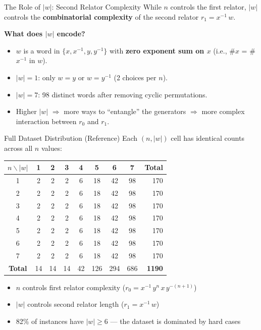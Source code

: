 \documentclass[aspectratio=169,11pt]{beamer}
\newcommand{\inv}[1]{#1^{-1}}
\begin{document}
\begin{frame}{The Role of $|w|$: Second Relator Complexity}
  \small
  While $n$ controls the first relator, $|w|$ controls the \textbf{combinatorial complexity}
  of the second relator $r_1 = \inv{x}\, w$.

  \medskip
  \textbf{What does $|w|$ encode?}
  \begin{itemize}\setlength\itemsep{2pt}
    \item $w$ is a word in $\{x, \inv{x}, y, \inv{y}\}$ with \textbf{zero exponent sum on $x$}
      (i.e., \#$x$ = \#$\inv{x}$ in $w$).
    \item $|w| = 1$: only $w = y$ or $w = \inv{y}$ (2 choices per $n$).
    \item $|w| = 7$: 98 distinct words after removing cyclic permutations.
    \item Higher $|w|$ $\Rightarrow$ more ways to ``entangle'' the generators
      $\Rightarrow$ more complex interaction between $r_0$ and $r_1$.
  \end{itemize}

\end{frame}

\begin{frame}{Full Dataset Distribution (Reference)}
  Each $(n, |w|)$ cell has identical counts across all $n$ values:

  \medskip
  \begin{center}
  \small
  \begin{tabular}{c|ccccccc|r}
    \toprule
    $n \backslash |w|$ & 1 & 2 & 3 & 4 & 5 & 6 & 7 & \textbf{Total} \\
    \midrule
    1 & 2 & 2 & 2 & 6 & 18 & 42 & 98 & 170 \\
    2 & 2 & 2 & 2 & 6 & 18 & 42 & 98 & 170 \\
    3 & 2 & 2 & 2 & 6 & 18 & 42 & 98 & 170 \\
    4 & 2 & 2 & 2 & 6 & 18 & 42 & 98 & 170 \\
    5 & 2 & 2 & 2 & 6 & 18 & 42 & 98 & 170 \\
    6 & 2 & 2 & 2 & 6 & 18 & 42 & 98 & 170 \\
    7 & 2 & 2 & 2 & 6 & 18 & 42 & 98 & 170 \\
    \midrule
    \textbf{Total} & 14 & 14 & 14 & 42 & 126 & 294 & 686 & \textbf{1190} \\
    \bottomrule
  \end{tabular}
  \end{center}

  \bigskip
  \begin{itemize}
    \item $n$ controls first relator complexity ($r_0 = \inv{x}\, y^n\, x\, y^{-(n+1)}$)
    \item $|w|$ controls second relator length ($r_1 = \inv{x}\, w$)
    \item 82\% of instances have $|w| \ge 6$ --- the dataset is dominated by hard cases
  \end{itemize}
\end{frame}
\end{document}
